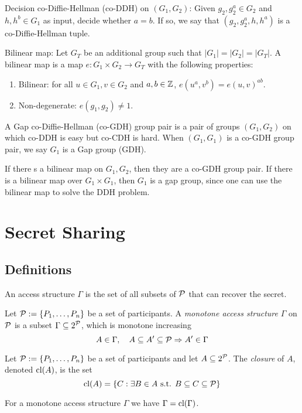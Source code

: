  Decision co-Diffie-Hellman (co-DDH) on $(G_1, G_2)$: Given $g_2, g^a_2 \in G_2$ and $h, h^b \in G_1$ as input, decide whether $a=b$. If so, we say that $(g_2, g^a_2, h, h^a)$ is a co-Diffie-Hellman tuple.

 Bilinear map: Let $G_T$ be an additional group such that $ |G_1| = |G_2| = |G_T| $. A bilinear map is a map $e: G_1 \times G_2 \rightarrow G_T$ with the following properties:
\begin{enumerate}

\item Bilinear: for all $u \in G_1, v \in G_2$ and $a,b \in {\mathbb Z}$, $e(u^a, v^b) = e(u,v)^{ab}$.
\item Non-degenerate: $e(g_1, g_2) \neq 1$.

\end{enumerate}

 A Gap co-Diffie-Hellman (co-GDH) group pair is a pair of groups $(G_1, G_2)$ on which co-DDH is easy but co-CDH is hard. When $(G_1, G_1)$ is a co-GDH group pair, we say $G_1$ is a Gap group (GDH).

\remk If there s a bilinear map on $G_1, G_2$, then they are a co-GDH group pair. If there is a bilinear map over $G_1 \times G_1$, then $G_1$ is a gap group, since one can use the bilinear map to solve the DDH problem.

\section{Secret Sharing}
\subsection{Definitions}
\nocite{Phillips1992} \nocite{BlSt97}
 An access structure $\Gamma$ is the set of all subsets of ${\mathcal P}$ that can recover the secret.

 Let ${\mathcal P} := \{ P_1, \dots, P_n \}$ be a set of participants. A \textit{monotone access structure} $\Gamma$ on ${\mathcal P}$ is a subset $\Gamma \subseteq 2^{{\mathcal P}}$, which is monotone increasing $$ A \in \Gamma, \quad A \subseteq A' \subseteq {\mathcal P} \Rightarrow A' \in \Gamma $$

 Let ${\mathcal P} := \{ P_1, \dots, P_n \}$ be a set of participants and let $A \subseteq 2^{{\mathcal P}}$. The \textit{closure} of $A$, denoted $\text{cl} (A)$, is the set $$ \text{cl} (A) = \{ C: \exists B \in A \text{ s.t. } B \subseteq C \subseteq {\mathcal P} \}$$

For a monotone access structure $\Gamma$ we have $\Gamma = \text{cl} (\Gamma)$.

